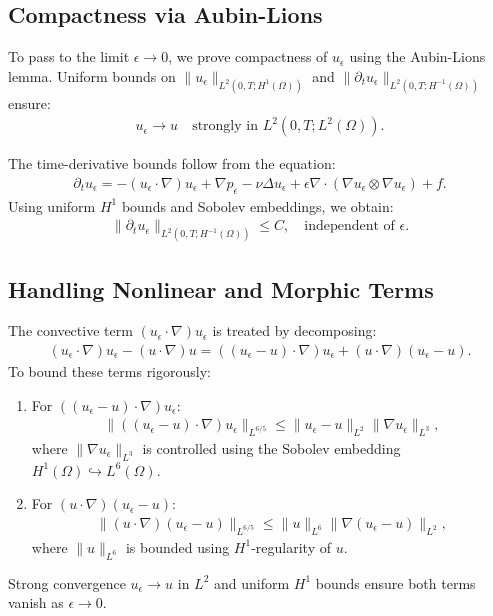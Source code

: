 \documentclass[12pt]{article}
\begin{document}
\subsection{Compactness via Aubin-Lions}

To pass to the limit $\epsilon \to 0$, we prove compactness of $u_\epsilon$ using the Aubin-Lions lemma. Uniform bounds on $\| u_\epsilon \|_{L^2(0,T; H^1(\Omega))}$ and $\| \partial_t u_\epsilon \|_{L^2(0,T; H^{-1}(\Omega))}$ ensure:
\begin{align}
    u_\epsilon \to u \quad \text{strongly in } L^2(0, T; L^2(\Omega)).
\end{align}

The time-derivative bounds follow from the equation:
\begin{align}
\partial_t u_\epsilon = - (u_\epsilon \cdot \nabla) u_\epsilon + \nabla p_\epsilon - \nu \Delta u_\epsilon + \epsilon \nabla \cdot (\nabla u_\epsilon \otimes \nabla u_\epsilon) + f.
\end{align}
Using uniform $H^1$ bounds and Sobolev embeddings, we obtain:
\begin{align}
\| \partial_t u_\epsilon \|_{L^2(0, T; H^{-1}(\Omega))} \leq C, \quad \text{independent of } \epsilon.
\end{align}

\subsection{Handling Nonlinear and Morphic Terms}

The convective term $(u_\epsilon \cdot \nabla) u_\epsilon$ is treated by decomposing:
\begin{align}
    (u_\epsilon \cdot \nabla) u_\epsilon - (u \cdot \nabla) u = ((u_\epsilon - u) \cdot \nabla) u_\epsilon + (u \cdot \nabla)(u_\epsilon - u).
\end{align}
To bound these terms rigorously:
\begin{enumerate}
    \item For $((u_\epsilon - u) \cdot \nabla) u_\epsilon$:
    \begin{align}
    \| ((u_\epsilon - u) \cdot \nabla) u_\epsilon \|_{L^{6/5}} \leq \| u_\epsilon - u \|_{L^2} \| \nabla u_\epsilon \|_{L^3},
    \end{align}
    where $\| \nabla u_\epsilon \|_{L^3}$ is controlled using the Sobolev embedding $H^1(\Omega) \hookrightarrow L^6(\Omega)$.
    \item For $(u \cdot \nabla)(u_\epsilon - u)$:
    \begin{align}
    \| (u \cdot \nabla)(u_\epsilon - u) \|_{L^{6/5}} \leq \| u \|_{L^6} \| \nabla(u_\epsilon - u) \|_{L^2},
    \end{align}
    where $\| u \|_{L^6}$ is bounded using $H^1$-regularity of $u$.
\end{enumerate}
Strong convergence $u_\epsilon \to u$ in $L^2$ and uniform $H^1$ bounds ensure both terms vanish as $\epsilon \to 0$.
\end{document}
